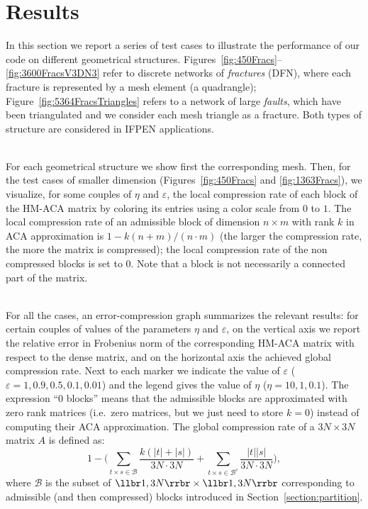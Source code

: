 


\section{Results}
\label{sec:results}

In this section we report a series of test cases to illustrate the performance of our code on different geometrical structures.
Figures~\ref{fig:450Fracs}--\ref{fig:3600FracsV3DN3} refer to discrete networks of \emph{fractures} (DFN), where each fracture is represented by a mesh element (a quadrangle);    
Figure~\ref{fig:5364FracsTriangles} refers to a network of large \emph{faults}, which have been triangulated and we consider each mesh triangle as a fracture. Both types of structure are considered in IFPEN applications.

\quad\\
For each geometrical structure we show first the corresponding mesh.
Then, for the test cases of smaller dimension (Figures~\ref{fig:450Fracs} and \ref{fig:1363Fracs}), we visualize, for some couples of $\eta$ and $\varepsilon$, the local compression rate of each block of the HM-ACA matrix by coloring its entries using a color scale from $0$ to $1$. The local compression rate of an admissible block of dimension $n\times m$ with rank $k$ in ACA approximation is $1-k(n+m)/(n\cdot m)$ (the larger the compression rate, the more the matrix is compressed); the local compression rate of the non compressed blocks is set to $0$. Note that a block is not necessarily a connected part of the matrix.

\quad\\
For all the cases, an error-compression graph summarizes the relevant results: for certain couples of values of the parameters $\eta$ and $\varepsilon$, on the vertical axis we report the relative error in Frobenius norm of the corresponding HM-ACA matrix with respect to the dense matrix, and on the horizontal axis the achieved global compression rate. Next to each marker we indicate the value of $\varepsilon$ ($\varepsilon=1, 0.9, 0.5, 0.1, 0.01$) and the legend gives the value of $\eta$ ($\eta=10,1,0.1$). The expression ``0 blocks'' means that the admissible blocks are approximated with zero rank matrices (i.e.~zero matrices, but we just need to store $k=0$) instead of computing their ACA approximation.
The global compression rate of a $3N\times 3N$ matrix $A$ is defined as:
\[
1- \Biggl(\sum_{t \times s \in \mathscr{B}}{\frac{k(\lvert t \rvert + \lvert s \rvert)}{3N\cdot3N} } + 
\sum_{t \times s \in \mathscr{B}^c}{\frac{\lvert t \rvert \lvert s \rvert}{3N\cdot3N} } \Biggr),
\]
where $\mathscr{B}$ is the subset of $\llbr 1,3N\rrbr\times \llbr 1,3N\rrbr$ corresponding to admissible (and then compressed) blocks introduced in Section~\ref{section:partition}.

